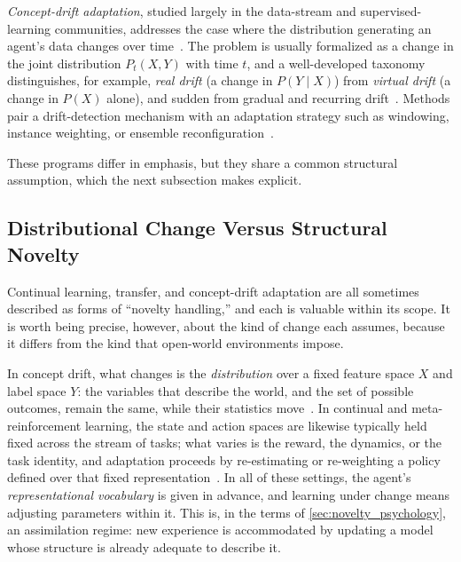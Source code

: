 \emph{Concept-drift adaptation}, studied largely in the data-stream and supervised-learning communities, addresses the case where the distribution generating an agent's data changes over time~\citep{widmer1996learning}. The problem is usually formalized as a change in the joint distribution $P_t(X, Y)$ with time $t$, and a well-developed taxonomy distinguishes, for example, \emph{real drift} (a change in $P(Y \mid X)$) from \emph{virtual drift} (a change in $P(X)$ alone), and sudden from gradual and recurring drift~\citep{gama2014survey}. Methods pair a drift-detection mechanism with an adaptation strategy such as windowing, instance weighting, or ensemble reconfiguration~\citep{lu2019concept}.

These programs differ in emphasis, but they share a common structural assumption, which the next subsection makes explicit.

\subsection{Distributional Change Versus Structural Novelty}
\label{sec:drift_vs_novelty}

Continual learning, transfer, and concept-drift adaptation are all sometimes described as forms of ``novelty handling,'' and each is valuable within its scope. It is worth being precise, however, about the kind of change each assumes, because it differs from the kind that open-world environments impose.

In concept drift, what changes is the \emph{distribution} over a fixed feature space $X$ and label space $Y$: the variables that describe the world, and the set of possible outcomes, remain the same, while their statistics move~\citep{gama2014survey, lu2019concept}. In continual and meta-reinforcement learning, the state and action spaces are likewise typically held fixed across the stream of tasks; what varies is the reward, the dynamics, or the task identity, and adaptation proceeds by re-estimating or re-weighting a policy defined over that fixed representation~\citep{khetarpal2022continual, finn2017maml}. In all of these settings, the agent's \emph{representational vocabulary} is given in advance, and learning under change means adjusting parameters within it. This is, in the terms of \cref{sec:novelty_psychology}, an assimilation regime: new experience is accommodated by updating a model whose structure is already adequate to describe it.

